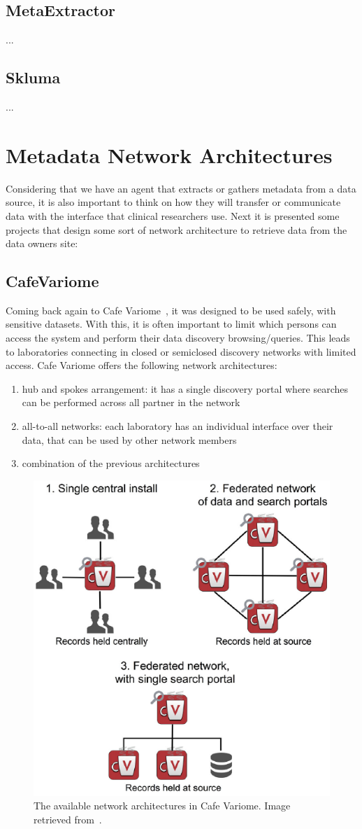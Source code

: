 \subsection*{MetaExtractor}
...

\subsection*{Skluma}
...


\section{Metadata Network Architectures}

Considering that we have an agent that extracts or gathers metadata from a data source,
it is also important to think on how they will transfer or communicate data with the
interface that clinical researchers use.
Next it is presented some projects that design some sort of network architecture to
retrieve data from the data owners site:


\subsection*{CafeVariome}
Coming back again to Cafe Variome~\cite{cafevariome}, it was designed to be used safely, with sensitive datasets.
With this, it is often important to limit which persons can access the system and perform their data discovery browsing/queries.
This leads to laboratories connecting in closed or semiclosed discovery networks with limited access.
Cafe Variome offers the following network architectures:
\begin{enumerate}
    \item hub and spokes arrangement: it has a single discovery portal where searches can be performed across all partner in the network
    \item all-to-all networks: each laboratory has an individual interface over their data, that can be used by other network members
    \item combination of the previous architectures
\end{enumerate}

\begin{figure}[H]
    \centering
    \includegraphics[width=.5\linewidth]{cafevariome-network.png}
    \caption{The available network architectures in Cafe Variome. Image retrieved from~\cite{cafevariome}.}
\end{figure}

